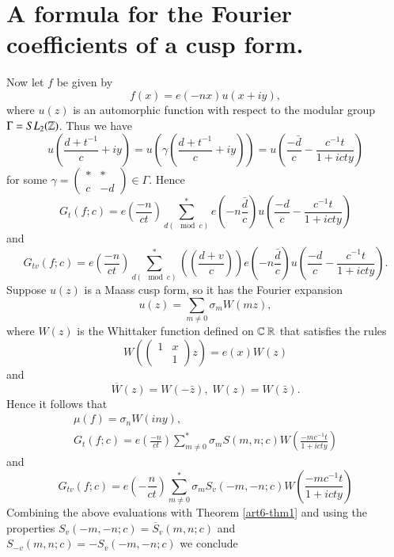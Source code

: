 \section{A formula for the Fourier coefficients of a cusp form.}\label{art6-sec3}
Now let $f$ be given by 
$$
f(x) =e(-nx) u (x+ iy),
$$
where $u(z)$ is an automorphic function with respect to the modular group $\Gamma=SL_2 (\mathbb{Z})$. Thus we have 
$$
u \left(\frac{d+t^{-1}}{c} + iy \right) = u \left(\gamma \left(\frac{d+t^{-1}}{c} + iy \right)  \right) = u \left(\frac{-\bar{d}}{c} - \frac{c^{-1}t}{1+ icty} \right)
$$
for some $\gamma = \begin{pmatrix}
\ast & \ast \\
c & -d
\end{pmatrix} \in \Gamma$. Hence
$$
G_t (f;c) = e \left( \frac{-n}{ct}\right) \sum\limits^\ast_{d (\mod c)} e \left(-n \frac{\bar{d}}{c} \right) u \left(\frac{-d}{c} - \frac{c^{-1}t}{1+ icty} \right)
$$
and 
$$
G_{tv} (f;c) = e \left(\frac{-n}{ct} \right) \sum\limits^\ast_{d(\mod c)} \left(\left( \frac{d+v}{c}\right) \right) e \left(-n\frac{\bar{d}}{c} \right) u \left(\frac{-d}{c} - \frac{c^{-1}t}{1+icty} \right).
$$\pageoriginale 
Suppose $u(z)$ is a Maass cusp form, so it has the Fourier expansion
$$
u(z) = \sum\limits_{m\neq 0} \sigma_m W (mz),
$$ 
where $W(z)$ is the Whittaker function defined on $\bbC \ \bbR$ that satisfies the rules 
$$
W \left(\left(\begin{matrix}
1 & x\\
& 1
\end{matrix} 
 \right) z\right) = e(x) W (z)
$$
and 
$$
\overline{W} (z) = W (-\bar{z}), \; W (z) = W (\bar{z}).
$$
Hence it follows that 
\begin{gather*}
\mu (f) = \sigma_n W (iny),\\
G_t(f;c ) =e \left(\frac{-n}{ct} \right) \sum\limits^\ast_{m\neq 0} \sigma_m S (m,n;c) W \left(\frac{-mc^{-1}t}{1+icty} \right)
\end{gather*}
and 
$$
G_{tv} (f;c) = e \left( -\frac{n}{ct}\right) \sum\limits^\ast_{m \neq 0} \sigma_m S_v (-m , -n ; c) W \left( \frac{-mc^{-1} t}{1+ icty}\right)
$$
Combining the above evaluations with Theorem \ref{art6-thm1} and using the properties $S_v (-m, -n;c) = \overline{S}_v (m,n;c)$ and $S_{-v} (m, n;c) = - S_v (-m, -n; c)$ we conclude 

